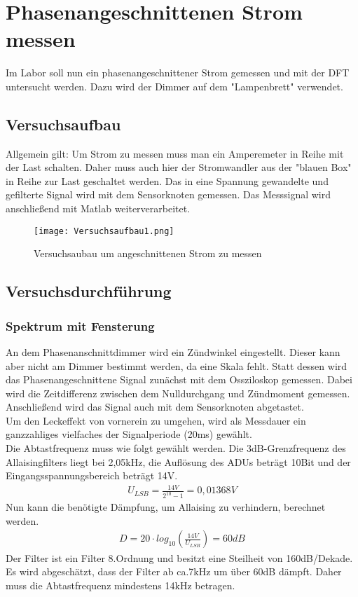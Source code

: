 \documentclass{article}%
\begin{document}
\section{Phasenangeschnittenen Strom messen}
Im Labor soll nun ein phasenangeschnittener Strom gemessen und mit der DFT untersucht werden.
Dazu wird der Dimmer auf dem "Lampenbrett" verwendet.
\subsection{Versuchsaufbau}
Allgemein gilt: Um Strom zu messen muss man ein Amperemeter in Reihe mit der Last schalten. Daher muss auch hier der Stromwandler aus der "blauen Box" in Reihe zur Last geschaltet werden. Das in eine Spannung gewandelte und gefilterte Signal wird mit dem Sensorknoten gemessen. Das Messsignal wird anschließend mit Matlab weiterverarbeitet.
\begin{figure}[htb]
\centering
\texttt{[image: Versuchsaufbau1.png]}
\caption{Versuchsaubau um angeschnittenen Strom zu messen}
\end{figure}
\subsection{Versuchsdurchführung}
\subsubsection{Spektrum mit Fensterung}
An dem Phasenanschnittdimmer wird ein Zündwinkel eingestellt. Dieser kann aber nicht am Dimmer bestimmt werden, da eine Skala fehlt. Statt dessen wird das Phasenangeschnittene Signal zunächst mit dem Ossziloskop gemessen. Dabei wird die Zeitdifferenz zwischen dem Nulldurchgang und Zündmoment gemessen. Anschließend wird das Signal auch mit dem Sensorknoten abgetastet.\\ Um den Leckeffekt von vornerein zu umgehen, wird als Messdauer ein ganzzahliges vielfaches der Signalperiode (20ms) gewählt.\\ Die Abtastfrequenz muss wie folgt gewählt werden. Die 3dB-Grenzfrequenz des Allaisingfilters liegt bei 2,05kHz, die Auflösung des ADUs beträgt 10Bit und der Eingangsspannungsbereich beträgt 14V.\\
\begin{align}
U_{LSB} = \frac{14V}{2^{10}-1} = 0,01368V 
\end{align} 
Nun kann die benötigte Dämpfung, um Allaising zu verhindern, berechnet werden.\\
\begin{align}
D = 20 \cdot log_{10}(\frac{14V}{U_{LSB}}) = 60dB
\end{align} 
Der Filter ist ein Filter 8.Ordnung und besitzt eine Steilheit von 160dB/Dekade. Es wird abgeschätzt, dass der Filter ab ca.7kHz um über 60dB dämpft. Daher muss die Abtastfrequenz mindestens 14kHz betragen.
\end{document}
